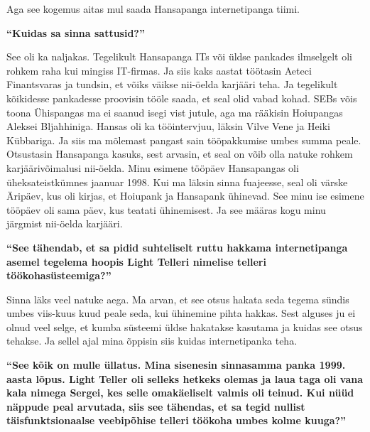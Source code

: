 Aga see kogemus aitas mul saada Hansapanga internetipanga 
tiimi.

\textbf{\enquote{Kuidas sa sinna sattusid?}}

See oli ka naljakas. Tegelikult Hansapanga ITs või üldse pankades ilmselgelt 
oli rohkem raha kui mingiss IT-firmas. Ja siis kaks aastat töötasin Aeteci 
Finantsvaras ja tundsin, et võiks väikse nii-öelda karjääri teha. Ja tegelikult 
kõikidesse pankadesse proovisin tööle saada, et seal olid vabad kohad. 
SEBs võis toona Ühispangas ma ei 
saanud isegi vist jutule, aga ma rääkisin Hoiupangas Aleksei 
Bljahhiniga. Hansas oli ka tööintervjuu, läksin 
Vilve Vene ja Heiki Kübbariga. Ja siis ma mõlemast pangast sain tööpakkumise umbes summa peale. 
Otsustasin Hansapanga kasuks, sest arvasin, et seal on võib olla natuke rohkem 
karjäärivõimalusi nii-öelda. Minu esimene tööpäev Hansapangas oli 
üheksateistkümnes jaanuar 1998. Kui ma läksin sinna fuajeesse, seal oli värske 
Äripäev, kus oli kirjas, et Hoiupank ja Hansapank ühinevad. See minu ise 
esimene tööpäev oli sama päev, kus teatati ühinemisest. Ja see määras kogu minu 
järgmist nii-öelda karjääri.


\textbf{\enquote{See tähendab, et sa pidid suhteliselt ruttu hakkama 
internetipanga asemel tegelema hoopis Light Telleri nimelise telleri 
töökohasüsteemiga?}}

Sinna läks veel natuke aega. Ma arvan, et see otsus hakata seda tegema sündis 
umbes viis-kuus kuud peale seda, kui ühinemine pihta hakkas. Sest alguses ju  
ei olnud veel selge, et kumba süsteemi üldse hakatakse kasutama ja kuidas see 
otsus tehakse. Ja sellel ajal mina õppisin siis kuidas internetipanka teha.

\textbf{\enquote{See kõik on mulle üllatus. Mina sisenesin sinnasamma panka 
1999. aasta lõpus. Light Teller oli selleks hetkeks olemas ja laua taga oli 
vana kala nimega Sergei, kes selle omakäeliselt valmis oli teinud. Kui nüüd 
näppude peal arvutada, siis see tähendas, et sa tegid nullist 
täisfunktsionaalse veebipõhise telleri töökoha umbes kolme kuuga?}}

